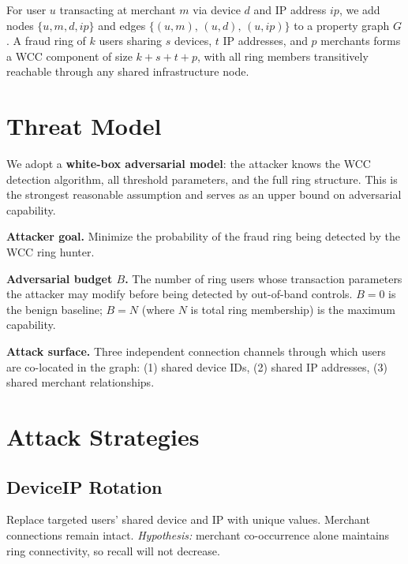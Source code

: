 \documentclass[sigconf,nonacm]{acmart}
\newcommand{\wcc}{\textsc{WCC}\xspace}
\begin{document}
For user $u$ transacting at merchant $m$ via device $d$ and IP address
$\mathit{ip}$, we add nodes $\{u, m, d, \mathit{ip}\}$ and edges
$\{(u,m),\,(u,d),\,(u,\mathit{ip})\}$ to a property graph $G$.  A fraud
ring of $k$ users sharing $s$ devices, $t$ IP addresses, and $p$ merchants
forms a \wcc component of size $k + s + t + p$, with all ring members
transitively reachable through any shared infrastructure node.

\section{Threat Model}

We adopt a \textbf{white-box adversarial model}: the attacker knows the
\wcc detection algorithm, all threshold parameters, and the full ring
structure.  This is the strongest reasonable assumption and serves as an
upper bound on adversarial capability.

\noindent\textbf{Attacker goal.}
Minimize the probability of the fraud ring being detected by the \wcc ring
hunter.

\noindent\textbf{Adversarial budget $B$.}
The number of ring users whose transaction parameters the attacker may
modify before being detected by out-of-band controls.  $B=0$ is the benign
baseline; $B=N$ (where $N$ is total ring membership) is the maximum
capability.

\noindent\textbf{Attack surface.}
Three independent connection channels through which users are co-located in
the graph: (1) shared device IDs, (2) shared IP addresses, (3) shared
merchant relationships.

\section{Attack Strategies}

\subsection{DeviceIP Rotation}
Replace targeted users' shared device and IP with unique values.  Merchant
connections remain intact.  \emph{Hypothesis:} merchant co-occurrence alone
maintains ring connectivity, so recall will not decrease.
\end{document}
